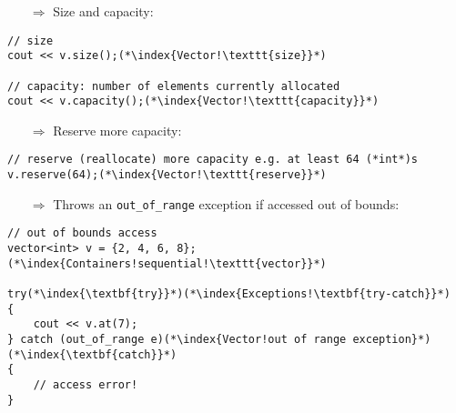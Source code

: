 \documentclass[10pt]{article}
\begin{document}
\begin{enumerate}
\item[$\Rightarrow$] Size and capacity:
\end{enumerate}
\begin{lstlisting}
// size
cout << v.size();(*\index{Vector!\texttt{size}}*)

// capacity: number of elements currently allocated
cout << v.capacity();(*\index{Vector!\texttt{capacity}}*)
\end{lstlisting}
\begin{enumerate}
\item[$\Rightarrow$] Reserve more capacity:
\end{enumerate}
\begin{lstlisting}
// reserve (reallocate) more capacity e.g. at least 64 (*int*)s
v.reserve(64);(*\index{Vector!\texttt{reserve}}*)
\end{lstlisting}
\begin{enumerate}
\item[$\Rightarrow$] Throws an \texttt{out\_of\_range} exception if accessed out of bounds:
\end{enumerate}
\begin{lstlisting}
// out of bounds access
vector<int> v = {2, 4, 6, 8};(*\index{Containers!sequential!\texttt{vector}}*)

try(*\index{\textbf{try}}*)(*\index{Exceptions!\textbf{try-catch}}*)
{
    cout << v.at(7);
} catch (out_of_range e)(*\index{Vector!out of range exception}*)(*\index{\textbf{catch}}*)
{
    // access error!
}
\end{lstlisting}
%
%
\end{document}
